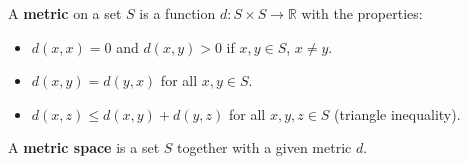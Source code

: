 A \textbf{metric} on a set $S$ is a function $d: S \times S \to \mathbb{R}$ with the properties:
\begin{itemize}
\item[D1.] $d(x, x) = 0$ and $d(x, y) > 0$ if $x, y \in S$, $x \neq y$.
\item[D2.] $d(x, y) = d(y, x)$ for all $x, y \in S$.
\item[D3.] $d(x, z) \leq d(x, y) + d(y, z)$ for all $x, y, z \in S$ (triangle inequality).
\end{itemize}
A \textbf{metric space} is a set $S$ together with a given metric $d$.
